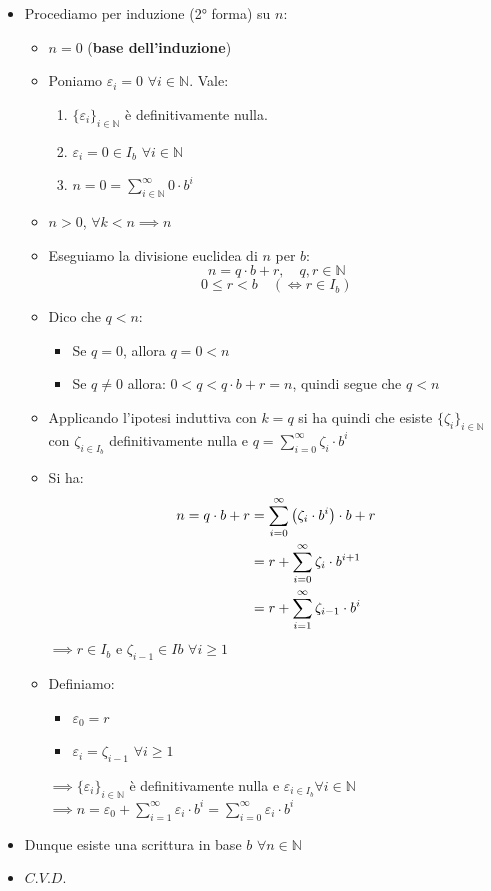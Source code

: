 \documentclass[10pt]{article}
\begin{document}
\begin{itemize}
\item
Procediamo per induzione (2° forma) su $n$:
\begin{itemize}
\item
$n=0$ (\textbf{base dell'induzione})
\item
Poniamo $\varepsilon_i = 0 \,\, \forall i \in \mathbb{N}$. Vale:
\begin{enumerate}
\item
$\{\varepsilon_i\}_{i \in \mathbb{N}}$ è definitivamente nulla.
\item
$\varepsilon_i = 0 \in I_b \,\, \forall i \in \mathbb{N}$
\item
$n=0 = \displaystyle{\sum_{i \in \mathbb{N}}^{\infty} 0 \cdot b^i}$
\end{enumerate}
\item
$n>0$, $\forall k < n \implies n$
\item
Eseguiamo la divisione euclidea di $n$ per $b$:
$$n = q \cdot b + r, \quad q,r \in \mathbb{N}$$
$$0 \leq r < b \quad (\Longleftrightarrow r \in I_b)$$
\item
Dico che $q<n$:
\begin{itemize}
\item
Se $q=0$, allora $q = 0 < n$
\item
Se $q \neq 0$ allora: $0 < q < q \cdot b + r = n$, quindi segue che $q < n$
\end{itemize}
\item
Applicando l'ipotesi induttiva con $k = q$ si ha quindi che esiste $\{\zeta_i\}_{i \in \mathbb{N}}$ con $\zeta_{i \in I_b}$ definitivamente nulla e $q = \displaystyle{\sum_{i=0}^{\infty} \zeta_i \cdot b^i}$
\item
Si ha:
\begin{equation}
\begin{split}
n = q \cdot b + r &= \displaystyle{\sum_{i=0}^{\infty} \left(\zeta_i \cdot b^i\right) \cdot b + r} \\
&= r + \displaystyle{\sum_{i=0}^{\infty} \zeta_i \cdot b^{i+1}} \\
&= r + \displaystyle{\sum_{i=1}^{\infty} \zeta_{i-1} \cdot b^{i}}
\notag
\end{split}
\end{equation}
$\implies r \in I_b$ e $\zeta_{i-1} \in Ib \,\, \forall i \geq 1$
\item
Definiamo:
\begin{itemize}
\item
$\varepsilon_0 = r$
\item
$\varepsilon_i = \zeta_{i-1} \,\, \forall i \geq 1$
\end{itemize}
$\implies \{\varepsilon_i\}_{i \in \mathbb{N}}$ è definitivamente nulla e $\varepsilon_{i \in I_b} \forall i \in \mathbb{N}$
$\implies n = \varepsilon_0 + \displaystyle{\sum_{i=1}^{\infty} \varepsilon_i \cdot b^i = \sum_{i=0}^{\infty} \varepsilon_i \cdot b^i}$
\end{itemize}
\item
Dunque esiste una scrittura in base $b$ $\forall n \in \mathbb{N}$
\item
$C.V.D.$
\end{itemize}
\end{document}
